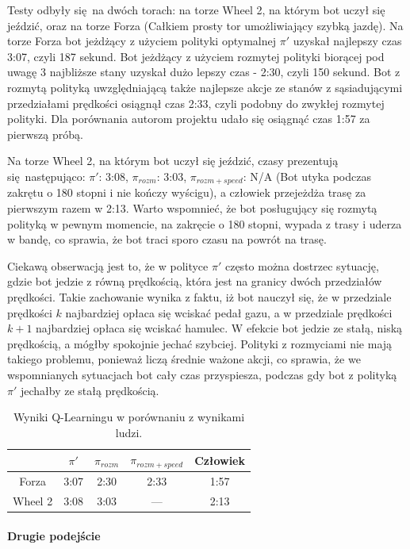 \documentclass{article}
\begin{document}
Testy odbyły się na dwóch torach: na torze Wheel 2, na którym bot uczył się jeździć, oraz na torze Forza (Całkiem prosty tor umożliwiający szybką jazdę). Na torze Forza bot jeżdżący z użyciem polityki optymalnej $\pi'$ uzyskał najlepszy czas 3:07, czyli 187 sekund. Bot jeżdżący z użyciem rozmytej polityki biorącej pod uwagę 3 najbliższe stany uzyskał dużo lepszy czas - 2:30, czyli 150 sekund. Bot z rozmytą polityką uwzględniającą także najlepsze akcje ze stanów z sąsiadującymi przedziałami prędkości osiągnął czas 2:33, czyli podobny do zwykłej rozmytej polityki. Dla porównania autorom projektu udało się osiągnąć czas 1:57 za pierwszą próbą.

Na torze Wheel 2, na którym bot uczył się jeździć, czasy prezentują się następująco: $\pi'$: 3:08, $\pi_{rozm}$: 3:03, $\pi_{rozm+speed}$: N/A (Bot utyka podczas zakrętu o 180 stopni i nie kończy wyścigu), a człowiek przejeżdża trasę za pierwszym razem w 2:13. Warto wspomnieć, że bot posługujący się rozmytą polityką w pewnym momencie, na zakręcie o 180 stopni, wypada z trasy i uderza w bandę, co sprawia, że bot traci sporo czasu na powrót na trasę.

Ciekawą obserwacją jest to, że w polityce $\pi'$ często można dostrzec sytuację, gdzie bot jedzie z równą prędkością, która jest na granicy dwóch przedziałów prędkości. Takie zachowanie wynika z faktu, iż bot nauczył się, że w przedziale prędkości $k$ najbardziej opłaca się wciskać pedał gazu, a w przedziale prędkości $k+1$ najbardziej opłaca się wciskać hamulec. W efekcie bot jedzie ze stałą, niską prędkością, a mógłby spokojnie jechać szybciej. Polityki z rozmyciami nie mają takiego problemu, ponieważ liczą średnie ważone akcji, co sprawia, że we wspomnianych sytuacjach bot cały czas przyspiesza, podczas gdy bot z polityką $\pi'$ jechałby ze stałą prędkością.

\begin{table}[h]
\centering
\begin{tabular}[c]{|c|c|c|c|c|}
\hline
\textbf{} & \textbf{$\pi'$} & \textbf{$\pi_{rozm}$} & \textbf{$\pi_{rozm+speed}$} & \textbf{Człowiek} \\
\hline
Forza & 3:07 & 2:30 & 2:33 & 1:57\\
\hline
Wheel 2 & 3:08 & 3:03 & --- & 2:13\\
\hline
\end{tabular}
\caption{Wyniki Q-Learningu w porównaniu z wynikami ludzi.}
\end{table}

\paragraph{Drugie podejście}
\end{document}
